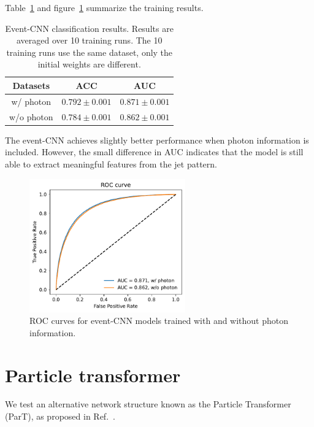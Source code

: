 \documentclass[12pt]{article}
\begin{document}
        Table~\ref{tab:supervised_event_CNN_training_results_diphoton_w_wo_photon} and figure~\ref{fig:eventCNN_roc_curve} summarize the training results. 
        \begin{table}[htpb]
            \centering
            \caption{Event-CNN classification results. Results are averaged over 10 training runs. The 10 training runs use the same dataset, only the initial weights are different.}
            \label{tab:supervised_event_CNN_training_results_diphoton_w_wo_photon}
            \begin{tabular}{c|cc}
                 Datasets  & ACC               & AUC               \\ \hline
                 w/ photon & $0.792 \pm 0.001$ & $0.871 \pm 0.001$ \\
                 w/o photon & $0.784 \pm 0.001$ & $0.862 \pm 0.001$ \\
			\end{tabular}
        \end{table}
        The event-CNN achieves slightly better performance when photon information is included. However, the small difference in AUC indicates that the model is still able to extract meaningful features from the jet pattern.
        \begin{figure}[htpb]
            \centering
            \includegraphics[width=0.60\textwidth]{roc_curve_supervised.pdf}
            \caption{ROC curves for event-CNN models trained with and without photon information.}
            \label{fig:eventCNN_roc_curve}
        \end{figure}
\section{Particle transformer}%
\label{sec:particle_transformer}
	We test an alternative network structure known as the Particle Transformer (ParT), as proposed in Ref.~\cite{Qu:2022mxj}.
\end{document}
